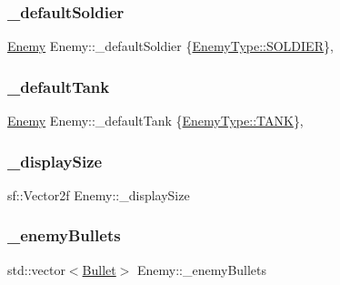\mbox{\label{class_enemy_ab8db9b04d15ed20f32c541b6a3fccecc}} 
\subsubsection{\texorpdfstring{\+\_\+default\+Soldier}{\_defaultSoldier}}
{\footnotesize\ttfamily \hyperlink{class_enemy}{Enemy} Enemy\+::\+\_\+default\+Soldier \{\hyperlink{_enemy_8h_ac3e413a86119db4b031458c7259e268ea36101183b0be7bffbbe6d24ef81987a1}{Enemy\+Type\+::\+S\+O\+L\+D\+I\+ER}\}\hspace{0.3cm}{\ttfamily [static]}, {\ttfamily [private]}}

\mbox{\label{class_enemy_a27c1284d98b8009247f0a1347811876f}} 
\subsubsection{\texorpdfstring{\+\_\+default\+Tank}{\_defaultTank}}
{\footnotesize\ttfamily \hyperlink{class_enemy}{Enemy} Enemy\+::\+\_\+default\+Tank \{\hyperlink{_enemy_8h_ac3e413a86119db4b031458c7259e268eafce7f36275b432d29255606c0f395dcd}{Enemy\+Type\+::\+T\+A\+NK}\}\hspace{0.3cm}{\ttfamily [static]}, {\ttfamily [private]}}

\mbox{\label{class_enemy_a27fcc8bffa13feb1097d41f4fa0532f8}} 
\subsubsection{\texorpdfstring{\+\_\+display\+Size}{\_displaySize}}
{\footnotesize\ttfamily sf\+::\+Vector2f Enemy\+::\+\_\+display\+Size\hspace{0.3cm}{\ttfamily [private]}}

\mbox{\label{class_enemy_ab0fb1cab49fa8580cd6ba8ce3d70b32e}} 
\subsubsection{\texorpdfstring{\+\_\+enemy\+Bullets}{\_enemyBullets}}
{\footnotesize\ttfamily std\+::vector$<$\hyperlink{class_bullet}{Bullet}$>$ Enemy\+::\+\_\+enemy\+Bullets\hspace{0.3cm}{\ttfamily [private]}}

